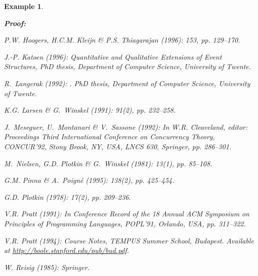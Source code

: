 \documentclass[twocolumn]{article}
\newtheorem{exam}{Example}
\newenvironment{example}[1]{\begin{exam} \rm \label{ex-#1} }{\end{exam}}
\newenvironment{proof}{\begin{trivlist} \item[\hspace{\labelsep}\bf
Proof:]}{\hfill \end{trivlist}}
\begin{document}
\begin{example}{causality}
\begin{proof}
\begin{thebibliography}{10}
{\sc P.W. Hoogers, H.C.M. Kleijn \& P.S. Thiagarajan} (1996):
 153, pp. 129--170.

{\sc J.-P. Katoen} (1996):
{\it Quantitative and Qualitative Extensions of Event Structures},
\newblock PhD thesis, Department of Computer Science, University of Twente.

{\sc R.~Langerak} (1992):
.
\newblock PhD thesis, Department of Computer Science, University of Twente.

{\sc K.G. Larsen \& G.~Winskel} (1991):
 91(2), pp. 232--258.

{\sc J.~Meseguer, U.~Montanari \& V.~Sassone} (1992):
\newblock In W.R. Cleaveland, editor: {Proceedings Third International
Conference on {\sl Concurrency Theory}, CONCUR'92, Stony Brook, NY,
USA}, LNCS 630, Springer, pp. 286--301.

{\sc M.~Nielsen, G.D. Plotkin \& G.~Winskel} (1981):
 13(1), pp. 85--108.

{\sc G.M. Pinna \& A.~Poign\'e} (1995):
 138(2), pp. 425--454.

{\sc G.D. Plotkin} (1978):
 17(2), pp. 209--236.

{\sc V.R. Pratt} (1991):
\newblock In {Conference Record of the 18 Annual ACM
Symposium on {\sl Principles of Programming Languages}, POPL'91,
Orlando, USA}, pp. 311--322.

{\sc V.R. Pratt} (1994):
\newblock Course Notes, TEMPUS Summer School, Budapest.
\newblock Available at \url{http://boole.stanford.edu/pub/bud.pdf}.

{\sc W. Reisig} (1985):
\newblock Springer.


\end{thebibliography}
\end{proof}
\end{example}
\end{document}

